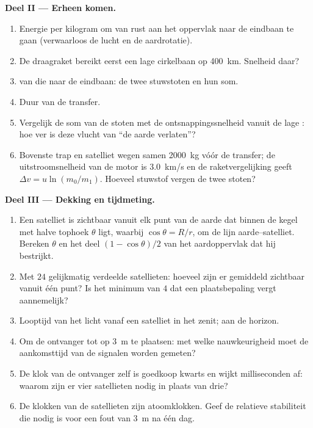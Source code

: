 \begin{problem}
\medskip
\noindent\textbf{Deel II --- Erheen komen.}
\begin{enumerate}[resume]
  \item Energie per kilogram om van rust aan het oppervlak naar de eindbaan
        te gaan (verwaarloos de lucht en de aardrotatie).
  \item De draagraket bereikt eerst een lage cirkelbaan op \qty{400}{km}.
        Snelheid daar?
  \item {} van die  naar de eindbaan: de twee stuwstoten
        en hun som.
  \item Duur van de transfer.
  \item Vergelijk de som van de stoten met de ontsnappingssnelheid vanuit de lage
        : hoe ver is deze vlucht van ``de aarde verlaten''?
  \item Bovenste trap en satelliet wegen samen \qty{2000}{kg} vóór de
        transfer; de uitstroomsnelheid van de motor is \qty{3.0}{km/s} en de
        raketvergelijking geeft $\Delta v = u\ln(m_0/m_1)$. Hoeveel stuwstof
        vergen de twee stoten?
\end{enumerate}

\medskip
\noindent\textbf{Deel III --- Dekking en tijdmeting.}
\begin{enumerate}[resume]
  \item Een satelliet is zichtbaar vanuit elk punt van de aarde dat binnen
        de kegel met halve tophoek $\theta$ ligt, waarbij $\cos\theta = R/r$,
        om de lijn aarde--satelliet. Bereken $\theta$ en het
        deel $(1 - \cos\theta)/2$ van het aardoppervlak dat hij bestrijkt.
  \item Met $24$ gelijkmatig verdeelde satellieten: hoeveel zijn er gemiddeld
        zichtbaar vanuit één punt? Is het minimum van $4$ dat een
        plaatsbepaling vergt aannemelijk?
  \item Looptijd van het licht vanaf een satelliet in het zenit; aan de
        horizon.
  \item Om de ontvanger tot op \qty{3}{m} te plaatsen: met welke
        nauwkeurigheid moet de aankomsttijd van de signalen worden gemeten?
  \item De klok van de ontvanger zelf is goedkoop kwarts en wijkt
        milliseconden af: waarom zijn er vier satellieten nodig in plaats van drie?
  \item De klokken van de satellieten zijn atoomklokken. Geef de relatieve
        stabiliteit die nodig is voor een fout van \qty{3}{m} na één dag.
\end{enumerate}


\end{problem}
